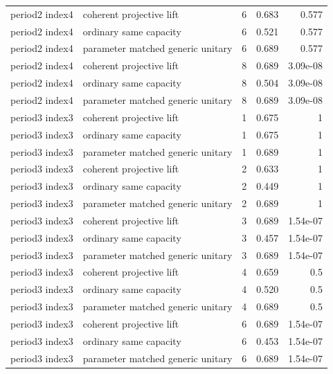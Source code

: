 \begin{tabular}{llrrr}
period2 index4 & coherent projective lift & 6 & 0.683 & 0.577\\
period2 index4 & ordinary same capacity & 6 & 0.521 & 0.577\\
period2 index4 & parameter matched generic unitary & 6 & 0.689 & 0.577\\
period2 index4 & coherent projective lift & 8 & 0.689 & 3.09e-08\\
period2 index4 & ordinary same capacity & 8 & 0.504 & 3.09e-08\\
period2 index4 & parameter matched generic unitary & 8 & 0.689 & 3.09e-08\\
period3 index3 & coherent projective lift & 1 & 0.675 & 1\\
period3 index3 & ordinary same capacity & 1 & 0.675 & 1\\
period3 index3 & parameter matched generic unitary & 1 & 0.689 & 1\\
period3 index3 & coherent projective lift & 2 & 0.633 & 1\\
period3 index3 & ordinary same capacity & 2 & 0.449 & 1\\
period3 index3 & parameter matched generic unitary & 2 & 0.689 & 1\\
period3 index3 & coherent projective lift & 3 & 0.689 & 1.54e-07\\
period3 index3 & ordinary same capacity & 3 & 0.457 & 1.54e-07\\
period3 index3 & parameter matched generic unitary & 3 & 0.689 & 1.54e-07\\
period3 index3 & coherent projective lift & 4 & 0.659 & 0.5\\
period3 index3 & ordinary same capacity & 4 & 0.520 & 0.5\\
period3 index3 & parameter matched generic unitary & 4 & 0.689 & 0.5\\
period3 index3 & coherent projective lift & 6 & 0.689 & 1.54e-07\\
period3 index3 & ordinary same capacity & 6 & 0.453 & 1.54e-07\\
period3 index3 & parameter matched generic unitary & 6 & 0.689 & 1.54e-07\\
\bottomrule
\end{tabular}
